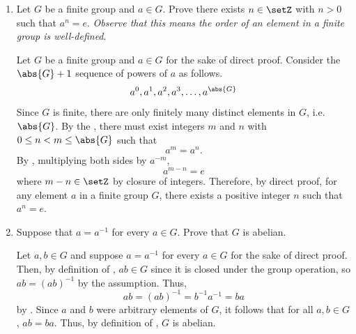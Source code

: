 \begin{enumerate}
\begin{subprove}
\begin{itemize}
      \item \textbf{Inverses:} Let $g \in H$. 
      Then, 
      \[
        a g = g a.
      \]
      By definition of  and , 
      $g \in G$, so has an inverse $g^{-1} \in G$.
      By the operation with $g^{-1}$,
      \[
        g^{-1} (a g) g^{-1} g^{-1} a=  a g^{-1} = g^{-1} (g a) g^{-1}.
      \]
      Thus, $g^{-1} \in H$, and hence every element in $H$ has an inverse in $H$.
    \end{itemize}
    Therefore, by the , $C(a)$ is a subgroup of $G$, 
    .
  \end{subprove}







  \newpage
  \item Let $G$ be a finite group and $a \in G$. 
  Prove there exists $n \in \setZ$ with $n>0$ such that $a^n=e$.
  \textit{Observe that this means the order of an element in a finite group is well-defined}.
  \begin{subprove}
    Let $G$ be a finite group and $a \in G$ for the sake of direct proof.
    Consider the $\abs{G} + 1$ sequence of powers of $a$ as follows.
    \[
      a^0, a^1, a^2, a^3, \ldots, a^{\abs{G}}
    \]
    Since $G$ is finite, there are only finitely many distinct elements in $G$, i.e. $\abs{G}$.
    By the , there must exist integers $m$ and $n$ with $0 \leq n < m \leq \abs{G}$ such that
    \[
      a^m = a^n.
    \]
    By , multiplying both sides by $a^{-m}$,
    \[
      a^{m-n} = e
    \]
    where $m-n \in \setZ$ by closure of integers.
    Therefore, by direct proof, for any element $a$ in a finite group $G$, 
    there exists a positive integer $n$ such that $a^n = e$.
  \end{subprove}
  \item Suppose that $a=a^{-1}$ for every $a \in G$. 
  Prove that $G$ is abelian.
  \begin{subprove}
    Let $a, b \in G$ and suppose $a=a^{-1}$ for every $a \in G$ for the sake of direct proof.
    Then, by definition of , $ab \in G$ since it is closed under 
    the group operation, so $ab=(ab)^{-1}$ by the assumption. Thus,
    \[
      ab = (a b)^{-1} = b^{-1} a^{-1} = b a
    \]
    by .
    Since $a$ and $b$ were arbitrary elements of $G$, 
    it follows that for all $a, b \in G$, $a b = b a$.
    Thus, by definition of , $G$ is abelian.
  \end{subprove}











\end{enumerate}
